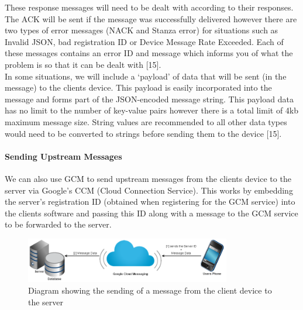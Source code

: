 \documentclass{article}
\begin{document}
These response messages will need to be dealt with according to their responses. The ACK will be sent if the message was successfully delivered however there are two types of error messages (NACK and Stanza error) for situations such as Invalid JSON, bad registration ID or Device Message Rate Exceeded. Each of these messages contains an error ID and message which informs you of what the problem is so that it can be dealt with [15].\\

In some situations, we will include a `payload' of data that will be sent (in the message) to the clients device. This payload is easily incorporated into the message and forms part of the JSON-encoded message string. This payload data has no limit to the number of key-value pairs however there is a total limit of 4kb maximum message size. String values are recommended to all other data types would need to be converted to strings before sending them to the device [15].\\
		
		\paragraph{Sending Upstream Messages}
		We can also use GCM to send upstream messages from the clients device to the server via Google's CCM (Cloud Connection Service). This works by embedding the server's registration ID (obtained when registering for the GCM service) into the clients software and passing this ID along with a message to the GCM service to be forwarded to the server.\\
		
	\begin{figure}[H]
		\centering
		\includegraphics[width=0.8\textwidth]{"GSM Sending a message upstream"}
		\caption{Diagram showing the sending of a message from the client device to the server}
	\end{figure}
	
\end{document}
